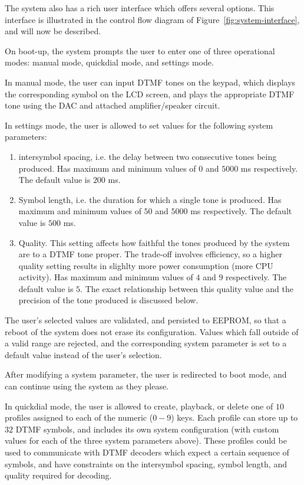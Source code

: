 \documentclass[11pt,a4paper,twocolumn]{scrartcl}
\begin{document}
   The system also has a rich user interface which offers several options. This interface is illustrated in the control flow diagram of Figure~\ref{fig:system-interface}, and will now be described.

   On boot-up, the system prompts the user to enter one of three operational modes: manual mode, quickdial mode, and settings mode.

   In manual mode, the user can input DTMF tones on the keypad, which displays the corresponding symbol on the LCD screen, and plays the appropriate DTMF tone using the DAC and attached amplifier/speaker circuit.

   In settings mode, the user is allowed to set values for the following system parameters:
   \begin{enumerate}
      \item intersymbol spacing, i.e. the delay between two consecutive tones being produced. Has maximum and minimum values of $0$ and $5000$ ms respectively. The default value is $200$ ms.
      \item Symbol length, i.e. the duration for which a single tone is produced. Has maximum and minimum values of $50$ and $5000$ ms respectively. The default value is $500$ ms.
      \item Quality. This setting affects how faithful the tones produced by the system are to a DTMF tone proper. The trade-off involves efficiency, so a higher quality setting results in slighlty more power consumption (more CPU activity). Has maximum and minimum values of $4$ and $9$ respectively. The default value is $5$. The exact relationship between this quality value and the precision of the tone produced is discussed below.
   \end{enumerate}

   The user's selected values are validated, and persisted to EEPROM, so that a reboot of the system does not erase its configuration. Values which fall outside of a valid range are rejected, and the corresponding system parameter is set to a default value instead of the user's selection.

   After modifying a system parameter, the user is redirected to boot mode, and can continue using the system as they please.

   In quickdial mode, the user is allowed to create, playback, or delete one of $10$ profiles assigned to each of the numeric ($0-9$) keys. Each profile can store up to $32$ DTMF symbols, and includes its own system configuration (with custom values for each of the three system parameters above). These profiles could be used to communicate with DTMF decoders which expect a certain sequence of symbols, and have constraints on the intersymbol spacing, symbol length, and quality required for decoding.
\end{document}
